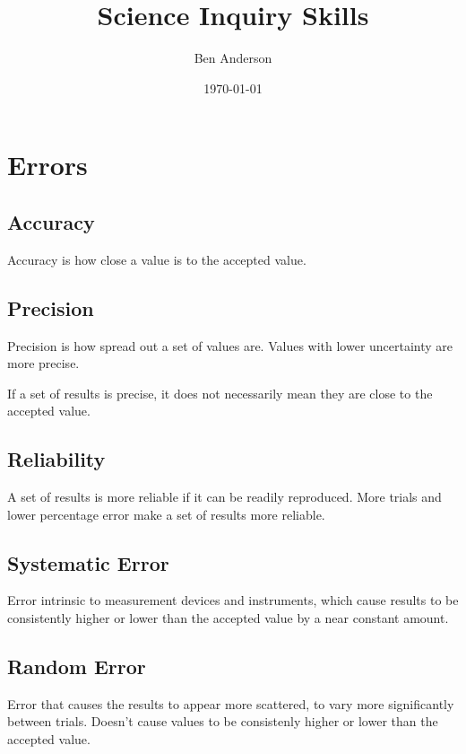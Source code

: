\documentclass[a4paper,11pt]{article}
\begin{document}
\title{Science Inquiry Skills}
\author{Ben Anderson}
\date{\today}
\maketitle

\pagebreak



\section{Errors}

\subsection{Accuracy}

Accuracy is how close a value is to the accepted value.


\subsection{Precision}

Precision is how spread out a set of values are. Values with lower uncertainty
are more precise.

If a set of results is precise, it does not necessarily mean they are close to
the accepted value.


\subsection{Reliability}

A set of results is more reliable if it can be readily reproduced. More trials
and lower percentage error make a set of results more reliable.


\subsection{Systematic Error}

Error intrinsic to measurement devices and instruments, which cause results to
be consistently higher or lower than the accepted value by a near constant
amount.


\subsection{Random Error}

Error that causes the results to appear more scattered, to vary more
significantly between trials. Doesn't cause values to be consistenly higher or
lower than the accepted value.
\end{document}
